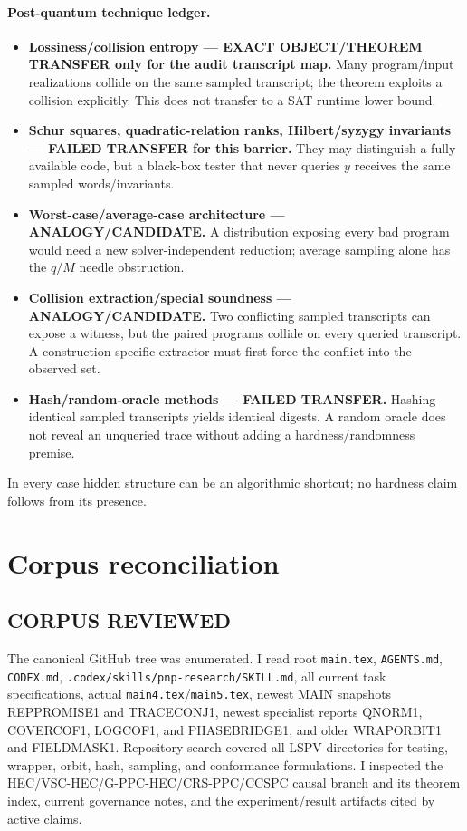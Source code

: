 \documentclass[11pt]{article}
\begin{document}
\paragraph{Post-quantum technique ledger.}
\begin{itemize}[leftmargin=*]
\item \textbf{Lossiness/collision entropy --- EXACT OBJECT/THEOREM TRANSFER only for the audit transcript map.}  Many program/input realizations collide on the same sampled transcript; the theorem exploits a collision explicitly.  This does not transfer to a SAT runtime lower bound.
\item \textbf{Schur squares, quadratic-relation ranks, Hilbert/syzygy invariants --- FAILED TRANSFER for this barrier.}  They may distinguish a fully available code, but a black-box tester that never queries $y$ receives the same sampled words/invariants.
\item \textbf{Worst-case/average-case architecture --- ANALOGY/CANDIDATE.}  A distribution exposing every bad program would need a new solver-independent reduction; average sampling alone has the $q/M$ needle obstruction.
\item \textbf{Collision extraction/special soundness --- ANALOGY/CANDIDATE.}  Two conflicting sampled transcripts can expose a witness, but the paired programs collide on every queried transcript.  A construction-specific extractor must first force the conflict into the observed set.
\item \textbf{Hash/random-oracle methods --- FAILED TRANSFER.}  Hashing identical sampled transcripts yields identical digests.  A random oracle does not reveal an unqueried trace without adding a hardness/randomness premise.
\end{itemize}
In every case hidden structure can be an algorithmic shortcut; no hardness claim follows from its presence.

\section{Corpus reconciliation}

\subsection*{CORPUS REVIEWED}
The canonical GitHub tree was enumerated.  I read root \texttt{main.tex}, \texttt{AGENTS.md}, \texttt{CODEX.md}, \texttt{.codex/skills/pnp-research/SKILL.md}, all current task specifications, actual \texttt{main4.tex}/\texttt{main5.tex}, newest MAIN snapshots REPPROMISE1 and TRACECONJ1, newest specialist reports QNORM1, COVERCOF1, LOGCOF1, and PHASEBRIDGE1, and older WRAPORBIT1 and FIELDMASK1.  Repository search covered all LSPV directories for testing, wrapper, orbit, hash, sampling, and conformance formulations.  I inspected the HEC/VSC-HEC/G-PPC-HEC/CRS-PPC/CCSPC causal branch and its theorem index, current governance notes, and the experiment/result artifacts cited by active claims.
\end{document}
